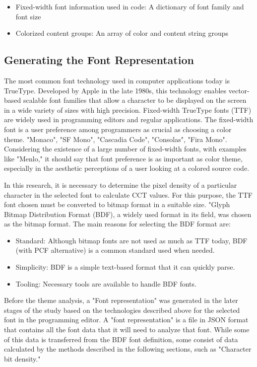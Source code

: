 \documentclass{article}
\begin{document}
\begin{itemize}
  \item Fixed-width font information used in code: A dictionary of font family and font size
  \item Colorized content groups: An array of color and content string groups
\end{itemize}

\subsection{Generating the Font Representation}

The most common font technology used in computer applications today is TrueType\cite{ttf2022reference}. Developed by Apple in the late 1980s, this technology enables vector-based scalable font families that allow a character to be displayed on the screen in a wide variety of sizes with high precision. Fixed-width TrueType fonts (TTF) are widely used in programming editors and regular applications. The fixed-width font is a user preference among programmers as crucial as choosing a color theme. "Monaco", "SF Mono", "Cascadia Code", "Consolas", "Fira Mono".
Considering the existence of a large number of\cite{wikipedia2022monospace} fixed-width fonts, with examples like "Menlo," it should say that font preference is as important as color theme, especially in the aesthetic perceptions of a user looking at a colored source code\cite{so2010monospace,quora2018monospace}.

In this research, it is necessary to determine the pixel density of a particular character in the selected font to calculate CCT values. For this purpose, the TTF font chosen must be converted to bitmap format in a suitable size. "Glyph Bitmap Distribution Format (BDF), a widely used format in its field, was chosen as the bitmap format. The main reasons for selecting the BDF format are:

\begin{itemize}
  \item Standard: Although bitmap fonts are not used as much as TTF today, BDF (with PCF alternative) is a common standard used when needed.
  \item Simplicity: BDF is a simple text-based format that it can quickly parse.
  \item Tooling: Necessary tools are available to handle BDF fonts.
\end{itemize}

Before the theme analysis, a "Font representation" was generated in the later stages of the study based on the technologies described above for the selected font in the programming editor. A "font representation" is a file in JSON format that contains all the font data that it will need to analyze that font. While some of this data is transferred from the BDF font definition, some consist of data calculated by the methods described in the following sections, such as "Character bit density."
\end{document}
